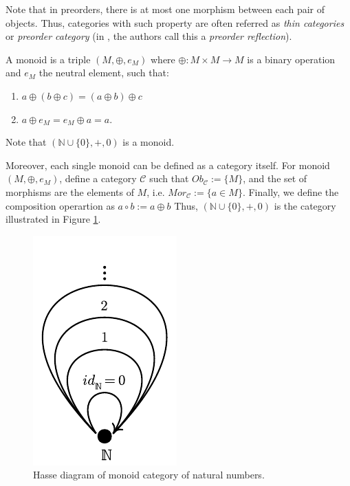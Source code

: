Note that in preorders, there is at most one morphism between each pair of objects.
Thus, categories with such property are often referred as \textit{thin categories}
or \textit{preorder category} (in \citet{fong2019invitation}, the authors call this
a \textit{preorder reflection}).

\begin{example}[Monoids]
  A monoid is a triple $(M, \oplus, e_M)$ where $\oplus:M\times M \to M$ is a binary operation
  and $e_M$ the neutral element, such that:
  \begin{enumerate}
    \item $a \oplus (b \oplus c) = (a \oplus b) \oplus c$
    \item $a \oplus e_M = e_M \oplus a = a$.
  \end{enumerate}
  Note that $(\mathbb N \cup\{ 0\}, +, 0)$ is a monoid.

  Moreover, each single monoid can be defined as a category itself. For
  monoid $(M, \oplus, e_M)$, define a category $\mathcal C$
  such that $Ob_\mathcal C := \{M\}$, and the set of morphisms
  are the elements of $M$, i.e.
  $Mor_\mathcal C := \{a \in M\}$. Finally, we define the composition
  operartion as $a \circ b := a \oplus b$
  Thus, $(\mathbb N \cup \{0\}, +, 0)$ is the category illustrated in
  Figure \ref{fig:NMonoid}.

  \begin{figure}[H]
    \begin{center}
      \includegraphics{./notebooks/NMonoid}
    \end{center}
    \caption{Hasse diagram of monoid category of natural numbers.}
    \label{fig:NMonoid}
  \end{figure}
  
\end{example}


